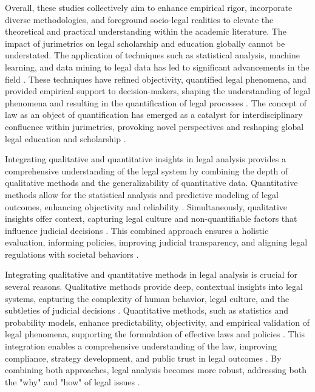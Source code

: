 Overall, these studies collectively aim to enhance empirical rigor, incorporate diverse methodologies, and foreground socio-legal realities to elevate the theoretical and practical understanding within the academic literature. The impact of jurimetrics on legal scholarship and education globally cannot be understated. The application of techniques such as statistical analysis, machine learning, and data mining to legal data has led to significant advancements in the field \cite{aafedeccbdaceab,cadcdbdbbdad,faecffafcada,aeadeccffe,ccdacdfbcdaf}. These techniques have refined objectivity, quantified legal phenomena, and provided empirical support to decision-makers, shaping the understanding of legal phenomena and resulting in the quantification of legal processes \cite{ccdacdfbcdaf,efbfffafaacadd}. The concept of law as an object of quantification has emerged as a catalyst for interdisciplinary confluence within jurimetrics, provoking novel perspectives and reshaping global legal education and scholarship \cite{losano2006}.

Integrating qualitative and quantitative insights in legal analysis provides a comprehensive understanding of the legal system by combining the depth of qualitative methods and the generalizability of quantitative data. Quantitative methods allow for the statistical analysis and predictive modeling of legal outcomes, enhancing objectivity and reliability \cite{ribeiro2021_pages_1-1, restrepo2015_pages_4-4}. Simultaneously, qualitative insights offer context, capturing legal culture and non-quantifiable factors that influence judicial decisions \cite{restrepo2015_pages_3-4, nunes2018_pages_100-101}. This combined approach ensures a holistic evaluation, informing policies, improving judicial transparency, and aligning legal regulations with societal behaviors \cite{massuanganhe2016_pages_25-25, silva2023_pages_3-4}.

Integrating qualitative and quantitative methods in legal analysis is crucial for several reasons. Qualitative methods provide deep, contextual insights into legal systems, capturing the complexity of human behavior, legal culture, and the subtleties of judicial decisions \cite{massuanganhe2016, restrepo2015}. Quantitative methods, such as statistics and probability models, enhance predictability, objectivity, and empirical validation of legal phenomena, supporting the formulation of effective laws and policies \cite{zabala2019, massuanganhe2016}. This integration enables a comprehensive understanding of the law, improving compliance, strategy development, and public trust in legal outcomes \cite{nunes2018, ribeiro2021}. By combining both approaches, legal analysis becomes more robust, addressing both the "why" and "how" of legal issues \cite{nunes2018}.

